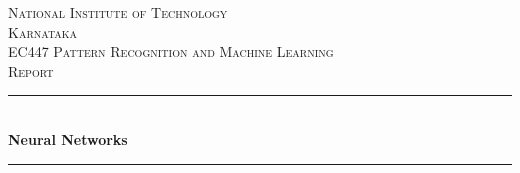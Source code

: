 \documentclass[12pt]{article}
\begin{document}
\begin{titlepage}
\newcommand{\HRule}{\rule{\linewidth}{0.5mm}} %

\center %
 

\textsc{\LARGE National Institute of Technology\\[0.2cm]Karnataka}\\[0.6cm] %
\textsc{\Large EC447 Pattern Recognition and Machine Learning}\\[0.5cm] %
\textsc{\large Report}\\[0.5cm] %


\HRule \\[0.4cm]
{ \huge \bfseries Neural Networks}\\[0.3cm] %
\HRule \\[0.3cm]
 


\end{titlepage}
\end{document}
